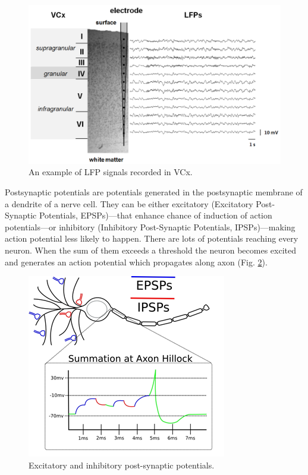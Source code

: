 \documentclass{pracalicmgr}
\begin{document}
   \begin{figure}[H]
   	\begin{center}
   		\includegraphics[scale=0.5]{VCx_LFPs2.png}
   	\end{center}
   	\caption{ An example of LFP signals recorded in VCx.}
   	\label{rys:VCx_LFPs}
   \end{figure} 
   
   Postsynaptic potentials are potentials generated in the postsynaptic membrane of a dendrite of a nerve cell. They can be either excitatory (Excitatory Post-Synaptic Potentials, EPSPs)---that enhance chance of induction of action potentials---or inhibitory (Inhibitory Post-Synaptic Potentials, IPSPs)---making action potential less likely to happen. There are lots of potentials reaching every neuron. When the sum of them exceeds a threshold the neuron becomes excited and generates an action potential which propagates along axon (Fig. \ref{rys:PSPs}).
   \begin{figure}[htbp]
   	\begin{center}
   		\includegraphics[scale=1]{PSPs.png}
   	\end{center}
   	\caption{Excitatory and inhibitory post-synaptic potentials.}
   	\label{rys:PSPs}
   \end{figure} 
   
\end{document}
